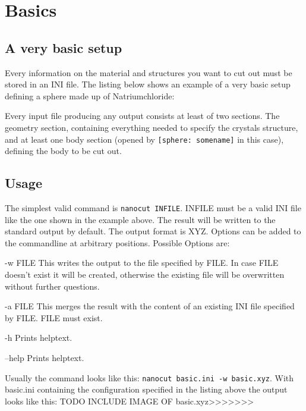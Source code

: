 \section{Basics}
\subsection{A very basic setup}

Every information on the material and structures you want to cut out must be stored in an INI file. The listing below shows an example of a very basic setup defining a sphere made up of Natriumchloride:

Every input file producing any output consists at least of two sections. The geometry section, containing everything needed to specify the crystals structure, and at least one body section (opened by \lstinline{[sphere: somename]} in this case), defining the body to be cut out.

\subsection{Usage}
The simplest valid command is \lstinline{nanocut INFILE}. INFILE must be a valid INI file like the one shown in the example above. The result will be written to the standard output by default. The output format is XYZ. Options can be added to the commandline at arbitrary positions. Possible Options are:
\begin{description}
 \item{-w FILE} This writes the output to the file specified by FILE. In case FILE doesn't exist it will be created, otherwise the existing file will be overwritten without further questions.
 \item{-a FILE} This merges the result with the content of an existing INI file specified by FILE. FILE must exist.
 \item{-h} Prints helptext.
 \item{--help} Prints helptext.
\end{description}
Usually the command looks like this: \lstinline{nanocut basic.ini -w basic.xyz}. With basic.ini containing the configuration specified in the listing above the output looks like this:
TODO INCLUDE IMAGE OF basic.xyz>>>>>>>
